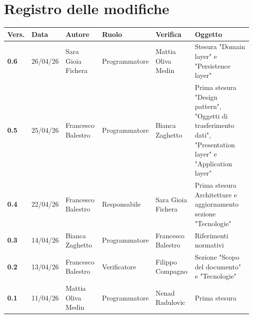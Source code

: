 \documentclass[a4paper,12pt]{article}
\begin{document}
    

    \section*{Registro delle modifiche} {
        \begin{table}[h!]
                \begin{tabularx}{\textwidth}{|l|l|l|l|L|L|}
                \hline
                \textbf{Vers.} & \textbf{Data} & \textbf{Autore} & \textbf{Ruolo} & \textbf{Verifica} & \textbf{Oggetto} \\
                \hline
                \textbf{0.6} & 26/04/26 & Sara Gioia Fichera & Programmatore & Mattia Oliva Medin & Stesura "Domain layer" e "Persistence layer" \\
                \hline
                \textbf{0.5} & 25/04/26 & Francesco Balestro & Programmatore & Bianca Zaghetto & Prima stesura "Design pattern", "Oggetti di trasferimento dati", "Presentation layer" e "Application layer" \\
                \hline
                \textbf{0.4} & 22/04/26 & Francesco Balestro & Responsabile & Sara Gioia Fichera & Prima stesura Architetture e aggiornamento sezione "Tecnologie" \\
                \hline
                \textbf{0.3} & 14/04/26 & Bianca Zaghetto & Programmatore & Francesco Balestro & Riferimenti normativi \\
                \hline
                \textbf{0.2} & 13/04/26 & Francesco Balestro & Verificatore & Filippo Compagno & Sezione "Scopo del documento" e "Tecnologie" \\
                \hline
                \textbf{0.1} & 11/04/26 & Mattia Oliva Medin & Programmatore & Nenad Radulovic & Prima stesura \\
                \hline
            \end{tabularx}
        \end{table}
    }
    \newpage
    
    \tableofcontents
    \newpage

    \listoffigures
    \newpage
    
    \listoftables
    \newpage
\end{document}
